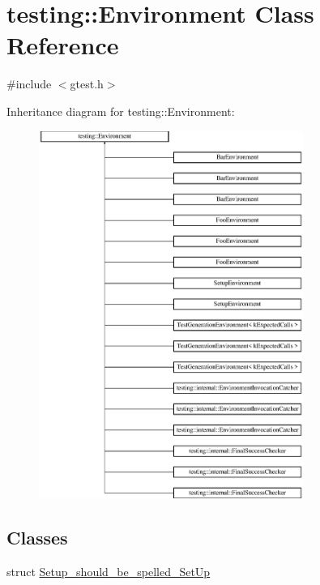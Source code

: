 \hypertarget{classtesting_1_1_environment}{}\section{testing\+::Environment Class Reference}
\label{classtesting_1_1_environment}


{\ttfamily \#include $<$gtest.\+h$>$}

Inheritance diagram for testing\+::Environment\+:\begin{figure}[H]
\begin{center}
\leavevmode
\includegraphics[height=12.000000cm]{d6/d91/classtesting_1_1_environment}
\end{center}
\end{figure}
\subsection*{Classes}
\begin{DoxyCompactItemize}
\item 
struct \mbox{\hyperlink{structtesting_1_1_environment_1_1_setup__should__be__spelled___set_up}{Setup\+\_\+should\+\_\+be\+\_\+spelled\+\_\+\+Set\+Up}}
\end{DoxyCompactItemize}
